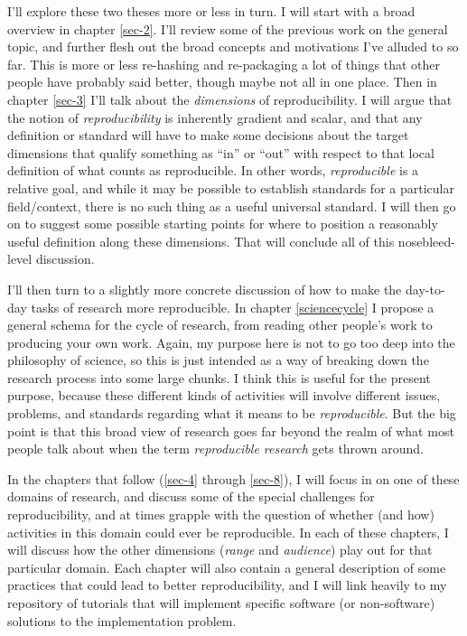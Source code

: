 \documentclass{book}
\begin{document}
I'll explore these two theses more or less in turn.  I will start with a broad overview in chapter \ref{sec-2}. I'll review some of the previous work on the general topic, and further flesh out the broad concepts and motivations I've alluded to so far. This is more or less re-hashing and re-packaging a lot of things that other people have probably said better, though maybe not all in one place. Then in chapter \ref{sec-3} I'll talk about the \emph{dimensions} of reproducibility. I will argue that the notion of \emph{reproducibility} is inherently gradient and scalar, and that any definition or standard will have to make some decisions about the target dimensions that qualify something as ``in'' or ``out'' with respect to that local definition of what counts as reproducible. In other words, \emph{reproducible} is a relative goal, and while it may be possible to establish standards for a particular field/context, there is no such thing as a useful universal standard. I will then go on to suggest some possible starting points for where to position a reasonably useful definition along these dimensions. That will conclude all of this nosebleed-level discussion.

I'll then turn to a slightly more concrete discussion of how to make the day-to-day tasks of research more reproducible. In chapter \ref{sciencecycle} I propose a general schema for the cycle of research, from reading other people's work to producing your own work.  Again, my purpose here is not to go too deep into the philosophy of science, so this is just intended as a way of breaking down the research process into some large chunks. I think this is useful for the present purpose, because these different kinds of activities will involve different issues, problems, and standards regarding what it means to be \emph{reproducible}. But the big point is that this broad view of research goes far beyond the realm of what most people talk about when the term \emph{reproducible research} gets thrown around. 

In the chapters that follow (\ref{sec-4} through \ref{sec-8}), I will focus in on one of these domains of research, and discuss some of the special challenges for reproducibility, and at times grapple with the question of whether (and how) activities in this domain could ever be reproducible. In each of these chapters, I will discuss how the other dimensions (\emph{range} and \emph{audience}) play out for that particular domain. Each chapter will also contain a general description of some practices that could lead to better reproducibility, and I will link heavily to my repository of tutorials that will implement specific software (or non-software) solutions to the implementation problem.
\end{document}
